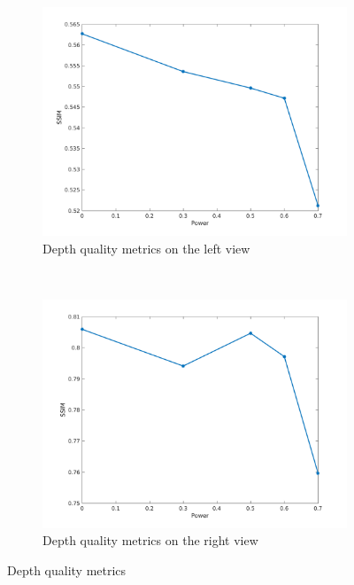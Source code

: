 \begin{figure}[h!]
    \centering
    \begin{subfigure}[t]{0.5\textwidth}
        \centering
\includegraphics[width=1\textwidth]{./img/qm_right.png}
          \caption{\small{Depth quality metrics on the left view}}
\label{fig:qmcr}

    \end{subfigure}%
    ~ 
    \begin{subfigure}[t]{0.5\textwidth}
        \centering
\includegraphics[width=1\textwidth]{./img/qm_disp_right.png}
           \caption{\small{Depth quality metrics on the right view}}
\label{fig:qmdr}
    \end{subfigure}
    \caption{Depth quality metrics }
        \label{fig:qmr}
\end{figure}
\clearpage

